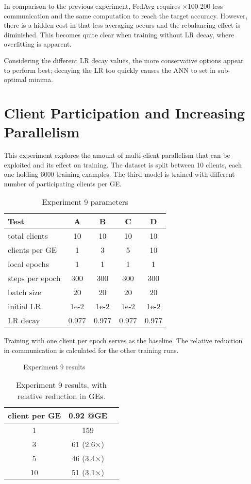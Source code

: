 In comparison to the previous experiment, FedAvg requires \(\times\)100-200 less communication and the same computation to reach the target accuracy. However, there is a hidden cost in that less averaging occurs and the rebalancing effect is diminished. This becomes quite clear when training without LR decay, where overfitting is apparent.

Considering the different LR decay values, the more conservative options appear to perform best; decaying the LR too quickly causes the ANN to set in sub-optimal minima.

\section{Client Participation and Increasing Parallelism}
This experiment explores the amount of multi-client parallelism that can be exploited and its effect on training. The dataset is split between 10 clients, each one holding 6000 training examples. The third model is trained with different number of participating clients per GE.
\begin{table}[H]
    \center
    \begin{tabular}{ | l | c | c | c | c | }
        \hline
        Test & A & B & C & D\\\hline
        total clients   & 10 & 10 & 10 & 10\\\hline
        clients per GE  & 1 & 3 & 5 & 10\\\hline
        local epochs    & 1 & 1 & 1 & 1\\\hline
        steps per epoch & 300 & 300 & 300 & 300\\\hline
        batch size      & 20 & 20 & 20 & 20\\\hline
        initial LR      & 1e-2 & 1e-2 & 1e-2 & 1e-2\\\hline
        LR decay        & 0.977 & 0.977 & 0.977 & 0.977\\\hline
    \end{tabular}
    \caption[Experiment 9 parameters]{Experiment 9 parameters}
\end{table}
Training with one client per epoch serves as the baseline. The relative reduction in communication is calculated for the other training runs.
\begin{figure}[H]
    \center
    
    \caption[Experiment 9 results]{Experiment 9 results}
    \label{fig:Experiment 9 results}
\end{figure}
\begin{table}[H]
\center
    \begin{tabular}{ | c | c | c | }
        \hline
        client per GE & 0.92 @GE\\\hline
        1 & 159\\\hline
        3 & 61 (2.6$\times$)\\\hline
        5 & 46 (3.4$\times$)\\\hline
        10 & 51 (3.1$\times$)\\\hline
    \end{tabular}
    \caption[Experiment 9 results]{Experiment 9 results, with relative reduction in GEs.}
\end{table}
